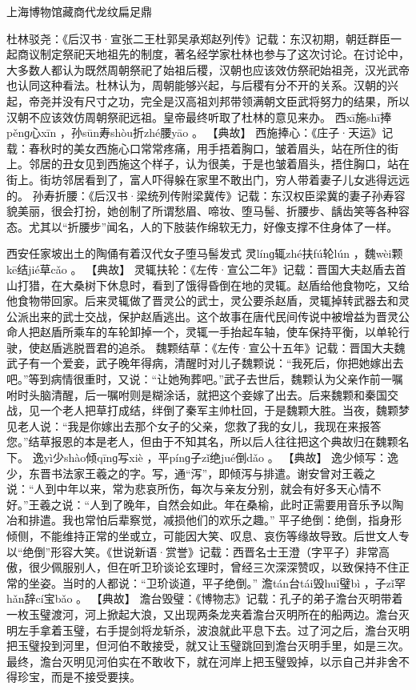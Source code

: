\documentclass[12pt,UTF8]{ctexbook}
\begin{document}
上海博物馆藏商代龙纹扁足鼎

杜林驳尧：《后汉书·宣张二王杜郭吴承郑赵列传》记载：东汉初期，朝廷群臣一起商议制定祭祀天地祖先的制度，著名经学家杜林也参与了这次讨论。在讨论中，大多数人都认为既然周朝祭祀了始祖后稷，汉朝也应该效仿祭祀始祖尧，汉光武帝也认同这种看法。杜林认为，周朝能够兴起，与后稷有分不开的关系。汉朝的兴起，帝尧并没有尺寸之功，完全是汉高祖刘邦带领满朝文臣武将努力的结果，所以汉朝不应该效仿周朝祭祀远祖。皇帝最终听取了杜林的意见来办。
西xī施shī捧pěnɡ心xīn
，孙sūn寿shòu折zhé腰yāo
。
【典故】
西施捧心：《庄子·天运》记载：春秋时的美女西施心口常常疼痛，用手捂着胸口，皱着眉头，站在所住的街上。邻居的丑女见到西施这个样子，认为很美，于是也皱着眉头，捂住胸口，站在街上。街坊邻居看到了，富人吓得躲在家里不敢出门，穷人带着妻子儿女逃得远远的。
孙寿折腰：《后汉书·梁统列传附梁冀传》记载：东汉权臣梁冀的妻子孙寿容貌美丽，很会打扮，她创制了所谓愁眉、啼妆、堕马髻、折腰步、龋齿笑等各种容态。尤其以“折腰步”闻名，人的下肢装作绵软无力，好像支撑不住身体了一样。

西安任家坡出土的陶俑有着汉代女子堕马髻发式
灵línɡ辄zhé扶fú轮lún
，魏wèi颗kē结jié草cǎo
。
【典故】
灵辄扶轮：《左传·宣公二年》记载：晋国大夫赵盾去首山打猎，在大桑树下休息时，看到了饿得昏倒在地的灵辄。赵盾给他食物吃，又给他食物带回家。后来灵辄做了晋灵公的武士，灵公要杀赵盾，灵辄掉转武器去和灵公派出来的武士交战，保护赵盾逃出。这个故事在唐代民间传说中被增益为晋灵公命人把赵盾所乘车的车轮卸掉一个，灵辄一手抬起车轴，使车保持平衡，以单轮行驶，使赵盾逃脱晋君的追杀。
魏颗结草：《左传·宣公十五年》记载：晋国大夫魏武子有一个爱妾，武子晚年得病，清醒时对儿子魏颗说：“我死后，你把她嫁出去吧。”等到病情很重时，又说：“让她殉葬吧。”武子去世后，魏颗认为父亲作前一嘱咐时头脑清醒，后一嘱咐则是糊涂话，就把这个妾嫁了出去。后来魏颗和秦国交战，见一个老人把草打成结，绊倒了秦军主帅杜回，于是魏颗大胜。当夜，魏颗梦见老人说：“我是你嫁出去那个女子的父亲，您救了我的女儿，我现在来报答您。”结草报恩的本是老人，但由于不知其名，所以后人往往把这个典故归在魏颗名下。
逸yì少shào倾qīnɡ写xiè
，平pínɡ子zǐ绝jué倒dǎo
。
【典故】
逸少倾写：逸少，东晋书法家王羲之的字。写，通“泻”，即倾泻与排遣。谢安曾对王羲之说：“人到中年以来，常为悲哀所伤，每次与亲友分别，就会有好多天心情不好。”王羲之说：“人到了晚年，自然会如此。年在桑榆，此时正需要用音乐予以陶冶和排遣。我也常怕后辈察觉，减损他们的欢乐之趣。”
平子绝倒：绝倒，指身形倾侧，不能维持正常的坐或立，可能因大笑、叹息、哀伤等缘故导致。后世文人专以“绝倒”形容大笑。《世说新语·赏誉》记载：西晋名士王澄（字平子）非常高傲，很少佩服别人，但在听卫玠谈论玄理时，曾经三次深深赞叹，以致保持不住正常的坐姿。当时的人都说：“卫玠谈道，平子绝倒。”
澹tán台tái毁huǐ璧bì
，子zǐ罕hǎn辞cí宝bǎo
。
【典故】
澹台毁璧：《博物志》记载：孔子的弟子澹台灭明带着一枚玉璧渡河，河上掀起大浪，又出现两条龙夹着澹台灭明所在的船两边。澹台灭明左手拿着玉璧，右手提剑将龙斩杀，波浪就此平息下去。过了河之后，澹台灭明把玉璧投到河里，但河伯不敢接受，就又让玉璧跳回到澹台灭明手里，如是三次。最终，澹台灭明见河伯实在不敢收下，就在河岸上把玉璧毁掉，以示自己并非舍不得珍宝，而是不接受要挟。
\end{document}
